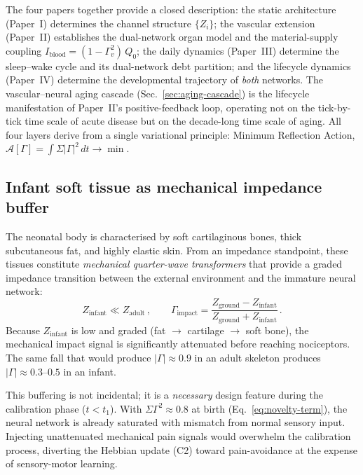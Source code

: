 ﻿\documentclass[aps,pre,twocolumn,superscriptaddress,floatfix]{revtex4-2}
\begin{document}
The four papers together provide a closed description:
the static architecture (Paper~I) determines the
channel structure $\{Z_i\}$;
the vascular extension (Paper~II) establishes the
dual-network organ model and the material-supply
coupling $I_{\mathrm{blood}} = (1-\Gamma_v^2)\,Q_0$;
the daily dynamics (Paper~III) determine the
sleep--wake cycle and its dual-network debt partition;
and the lifecycle dynamics (Paper~IV) determine the
developmental trajectory of \emph{both} networks.
The vascular--neural aging cascade
(Sec.~\ref{sec:aging-cascade}) is the lifecycle
manifestation of Paper~II's positive-feedback loop,
operating not on the tick-by-tick time scale of acute
disease but on the decade-long time scale of aging.
All four layers derive from a single variational
principle: Minimum Reflection Action,
$\mathcal{A}[\Gamma] = \int \Sigma|\Gamma|^2\,dt
\to \min$.


\subsection{Infant soft tissue as mechanical impedance buffer}
\label{sec:infant-buffer}

The neonatal body is characterised by soft cartilaginous
bones, thick subcutaneous fat, and highly elastic skin.
From an impedance standpoint, these tissues constitute
\emph{mechanical quarter-wave transformers} that provide
a graded impedance transition between the external
environment and the immature neural network:
\begin{equation}
  Z_{\text{infant}} \ll Z_{\text{adult}}\,,
  \qquad
  \Gamma_{\text{impact}} =
    \frac{Z_{\text{ground}} - Z_{\text{infant}}}
         {Z_{\text{ground}} + Z_{\text{infant}}}\,.
  \label{eq:infant-buffer}
\end{equation}
Because $Z_{\text{infant}}$ is low and graded (fat $\to$
cartilage $\to$ soft bone), the mechanical impact signal
is significantly attenuated before reaching nociceptors.
The same fall that would produce $|\Gamma|\approx 0.9$
in an adult skeleton produces
$|\Gamma|\approx 0.3$--$0.5$ in an infant.

This buffering is not incidental; it is a \emph{necessary}
design feature during the calibration phase ($t<t_1$).
With $\Sigma\Gamma^2\approx 0.8$ at birth
(Eq.~\ref{eq:novelty-term}), the neural network is
already saturated with mismatch from normal sensory input.
Injecting unattenuated mechanical pain signals would
overwhelm the calibration process, diverting the Hebbian
update (C2) toward pain-avoidance at the expense of
sensory-motor learning.
\end{document}
